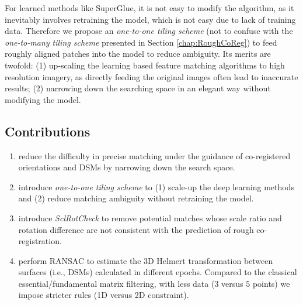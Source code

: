 For learned methods like SuperGlue, it is not easy to modify the algorithm, as it inevitably involves retraining the model, which is not easy due to lack of training data. Therefore we propose an \textit{one-to-one tiling scheme} (not to confuse with the \textit{one-to-many tiling scheme} presented in Section \ref{chap:RoughCoReg}) to feed roughly aligned patches into the model to reduce ambiguity. Its merits are twofold: (1) up-scaling the learning based feature matching algorithms to high resolution imagery, as directly feeding the original images often lead to inaccurate results; (2) narrowing down the searching space in an elegant way without modifying the model.
\subsection{Contributions}

\begin{enumerate}
	\item reduce the difficulty in precise matching under the guidance of co-registered orientations and \ac{DSM}s by narrowing down the search space.
	\item introduce \textit{one-to-one tiling scheme} to (1) scale-up the deep learning methods and (2) reduce matching ambiguity without retraining the model.
	\item introduce \textit{SclRotCheck} to remove potential matches whose scale ratio and rotation difference are not consistent with the prediction of rough co-registration.
	\item perform RANSAC to estimate the 3D Helmert transformation between surfaces (i.e., \ac{DSM}s) calculated in different epochs. Compared to the classical essential/fundamental matrix filtering, with less data (3 versus 5 points) we impose stricter rules (1D versus 2D constraint). %
\end{enumerate}

